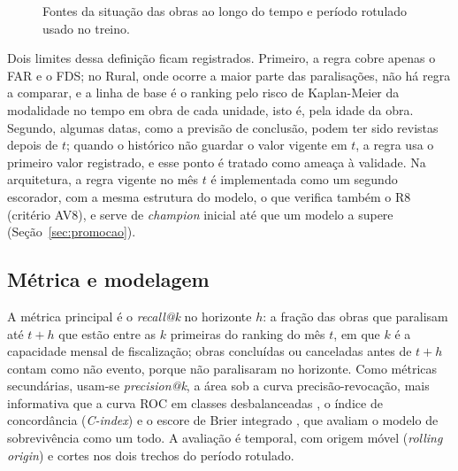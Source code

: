 \begin{figure}[htbp]
{%
	}
	\caption{Fontes da situação das obras ao longo do tempo e período rotulado usado no treino.}
	\label{fig:fontes}
\end{figure}

Dois limites dessa definição ficam registrados. Primeiro, a regra cobre apenas o FAR e o FDS; no Rural, onde ocorre a maior parte das paralisações, não há regra a comparar, e a linha de base é o ranking pelo risco de Kaplan-Meier da modalidade no tempo em obra de cada unidade, isto é, pela idade da obra. Segundo, algumas datas, como a previsão de conclusão, podem ter sido revistas depois de $t$; quando o histórico não guardar o valor vigente em $t$, a regra usa o primeiro valor registrado, e esse ponto é tratado como ameaça à validade. Na arquitetura, a regra vigente no mês $t$ é implementada como um segundo escorador, com a mesma estrutura do modelo, o que verifica também o R8 (critério AV8), e serve de \textit{champion} inicial até que um modelo a supere (Seção~\ref{sec:promocao}).

\subsection{Métrica e modelagem}

A métrica principal é o \textit{recall@k} no horizonte $h$: a fração das obras que paralisam até $t+h$ que estão entre as $k$ primeiras do ranking do mês $t$, em que $k$ é a capacidade mensal de fiscalização; obras concluídas ou canceladas antes de $t+h$ contam como não evento, porque não paralisaram no horizonte. Como métricas secundárias, usam-se \textit{precision@k}, a área sob a curva precisão-revocação, mais informativa que a curva ROC em classes desbalanceadas \cite{saito2015}, o índice de concordância (\textit{C-index}) \cite{harrell1996} e o escore de Brier integrado \cite{graf1999}, que avaliam o modelo de sobrevivência como um todo. A avaliação é temporal, com origem móvel (\textit{rolling origin}) e cortes nos dois trechos do período rotulado.

